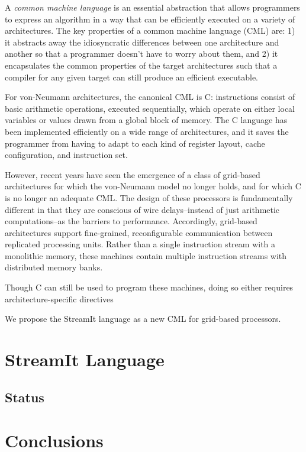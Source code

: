 \documentclass{sig-alternate}
\begin{document}
A {\it common machine language} is an essential abstraction that
allows programmers to express an algorithm in a way that can be
efficiently executed on a variety of architectures.  The key
properties of a common machine language (CML) are: 1) it abstracts
away the idiosyncratic differences between one architecture and
another so that a programmer doesn't have to worry about them, and 2)
it encapsulates the common properties of the target architectures such
that a compiler for any given target can still produce an efficient
executable.  

For von-Neumann architectures, the canonical CML is C: instructions
consist of basic arithmetic operations, executed sequentially, which
operate on either local variables or values drawn from a global block
of memory.  The C language has been implemented efficiently on a wide
range of architectures, and it saves the programmer from having to
adapt to each kind of register layout, cache configuration, and
instruction set.

However, recent years have seen the emergence of a class of grid-based
architectures \cite{raw, trips, smartmemories} for which the
von-Neumann model no longer holds, and for which C is no longer an
adequate CML.  The design of these processors is fundamentally
different in that they are conscious of wire delays--instead of just
arithmetic computations--as the barriers to performance.  Accordingly,
grid-based architectures support fine-grained, reconfigurable
communication between replicated processing units.  Rather than a
single instruction stream with a monolithic memory, these machines
contain multiple instruction streams with distributed memory banks.

Though C can still be used to program these machines, doing so either
requires architecture-specific directives 

We propose the StreamIt language as a new CML for grid-based
processors.  

\section{StreamIt Language}

\subsection{Status}

\section{Conclusions}
\end{document}
